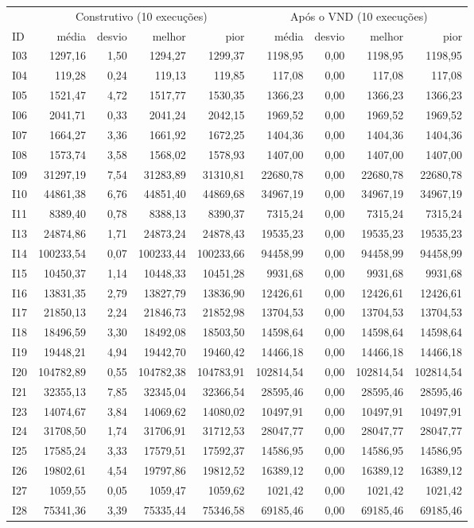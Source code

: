 \begin{tabular}{lrrrrrrrr}
\hline
 & \multicolumn{4}{c}{Construtivo (10 execuções)} & \multicolumn{4}{c}{Após o VND (10 execuções)} \\
ID & média & desvio & melhor & pior & média & desvio & melhor & pior \\
\hline
I03 & 1297,16 & 1,50 & 1294,27 & 1299,37 & 1198,95 & 0,00 & 1198,95 & 1198,95 \\
I04 & 119,28 & 0,24 & 119,13 & 119,85 & 117,08 & 0,00 & 117,08 & 117,08 \\
I05 & 1521,47 & 4,72 & 1517,77 & 1530,35 & 1366,23 & 0,00 & 1366,23 & 1366,23 \\
I06 & 2041,71 & 0,33 & 2041,24 & 2042,15 & 1969,52 & 0,00 & 1969,52 & 1969,52 \\
I07 & 1664,27 & 3,36 & 1661,92 & 1672,25 & 1404,36 & 0,00 & 1404,36 & 1404,36 \\
I08 & 1573,74 & 3,58 & 1568,02 & 1578,93 & 1407,00 & 0,00 & 1407,00 & 1407,00 \\
I09 & 31297,19 & 7,54 & 31283,89 & 31310,81 & 22680,78 & 0,00 & 22680,78 & 22680,78 \\
I10 & 44861,38 & 6,76 & 44851,40 & 44869,68 & 34967,19 & 0,00 & 34967,19 & 34967,19 \\
I11 & 8389,40 & 0,78 & 8388,13 & 8390,37 & 7315,24 & 0,00 & 7315,24 & 7315,24 \\
I13 & 24874,86 & 1,71 & 24873,24 & 24878,43 & 19535,23 & 0,00 & 19535,23 & 19535,23 \\
I14 & 100233,54 & 0,07 & 100233,44 & 100233,66 & 94458,99 & 0,00 & 94458,99 & 94458,99 \\
I15 & 10450,37 & 1,14 & 10448,33 & 10451,28 & 9931,68 & 0,00 & 9931,68 & 9931,68 \\
I16 & 13831,35 & 2,79 & 13827,79 & 13836,90 & 12426,61 & 0,00 & 12426,61 & 12426,61 \\
I17 & 21850,13 & 2,24 & 21846,73 & 21852,98 & 13704,53 & 0,00 & 13704,53 & 13704,53 \\
I18 & 18496,59 & 3,30 & 18492,08 & 18503,50 & 14598,64 & 0,00 & 14598,64 & 14598,64 \\
I19 & 19448,21 & 4,94 & 19442,70 & 19460,42 & 14466,18 & 0,00 & 14466,18 & 14466,18 \\
I20 & 104782,89 & 0,55 & 104782,38 & 104783,91 & 102814,54 & 0,00 & 102814,54 & 102814,54 \\
I21 & 32355,13 & 7,85 & 32345,04 & 32366,54 & 28595,46 & 0,00 & 28595,46 & 28595,46 \\
I23 & 14074,67 & 3,84 & 14069,62 & 14080,02 & 10497,91 & 0,00 & 10497,91 & 10497,91 \\
I24 & 31708,50 & 1,74 & 31706,91 & 31712,53 & 28047,77 & 0,00 & 28047,77 & 28047,77 \\
I25 & 17585,24 & 3,33 & 17579,51 & 17592,37 & 14586,95 & 0,00 & 14586,95 & 14586,95 \\
I26 & 19802,61 & 4,54 & 19797,86 & 19812,52 & 16389,12 & 0,00 & 16389,12 & 16389,12 \\
I27 & 1059,55 & 0,05 & 1059,47 & 1059,62 & 1021,42 & 0,00 & 1021,42 & 1021,42 \\
I28 & 75341,36 & 3,39 & 75335,44 & 75346,58 & 69185,46 & 0,00 & 69185,46 & 69185,46 \\
\hline
\end{tabular}
